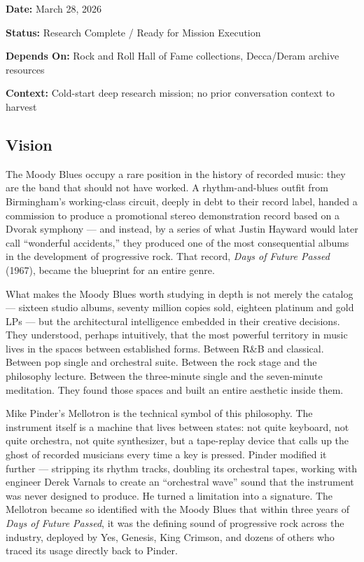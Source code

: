 \documentclass[11pt,letterpaper]{article}
\newcommand{\metafield}[2]{\textbf{\sffamily #1} #2\par}
\begin{document}
\metafield{Date:}{March 28, 2026}
\metafield{Status:}{Research Complete / Ready for Mission Execution}
\metafield{Depends On:}{Rock and Roll Hall of Fame collections, Decca/Deram archive resources}
\metafield{Context:}{Cold-start deep research mission; no prior conversation context to harvest}

\subsection{Vision}

The Moody Blues occupy a rare position in the history of recorded music: they are the band that should not have worked. A rhythm-and-blues outfit from Birmingham's working-class circuit, deeply in debt to their record label, handed a commission to produce a promotional stereo demonstration record based on a Dvorak symphony --- and instead, by a series of what Justin Hayward would later call ``wonderful accidents,'' they produced one of the most consequential albums in the development of progressive rock. That record, \textit{Days of Future Passed} (1967), became the blueprint for an entire genre.

What makes the Moody Blues worth studying in depth is not merely the catalog --- sixteen studio albums, seventy million copies sold, eighteen platinum and gold LPs --- but the architectural intelligence embedded in their creative decisions. They understood, perhaps intuitively, that the most powerful territory in music lives in the spaces between established forms. Between R\&B and classical. Between pop single and orchestral suite. Between the rock stage and the philosophy lecture. Between the three-minute single and the seven-minute meditation. They found those spaces and built an entire aesthetic inside them.

Mike Pinder's Mellotron is the technical symbol of this philosophy. The instrument itself is a machine that lives between states: not quite keyboard, not quite orchestra, not quite synthesizer, but a tape-replay device that calls up the ghost of recorded musicians every time a key is pressed. Pinder modified it further --- stripping its rhythm tracks, doubling its orchestral tapes, working with engineer Derek Varnals to create an ``orchestral wave'' sound that the instrument was never designed to produce. He turned a limitation into a signature. The Mellotron became so identified with the Moody Blues that within three years of \textit{Days of Future Passed}, it was the defining sound of progressive rock across the industry, deployed by Yes, Genesis, King Crimson, and dozens of others who traced its usage directly back to Pinder.
\end{document}
